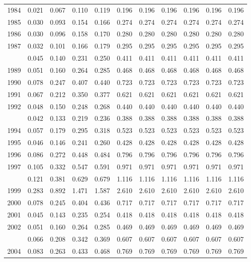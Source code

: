\documentclass[
]{article}
\begin{document}
\begin{longtable}[t]{lrrrrrrrrrr}
1984 & 0.021 & 0.067 & 0.110 & 0.119 & 0.196 & 0.196 & 0.196 & 0.196 & 0.196 & 0.196\\
1985 & 0.030 & 0.093 & 0.154 & 0.166 & 0.274 & 0.274 & 0.274 & 0.274 & 0.274 & 0.274\\
1986 & 0.030 & 0.096 & 0.158 & 0.170 & 0.280 & 0.280 & 0.280 & 0.280 & 0.280 & 0.280\\
1987 & 0.032 & 0.101 & 0.166 & 0.179 & 0.295 & 0.295 & 0.295 & 0.295 & 0.295 & 0.295\\
\addlinespace
1988 & 0.045 & 0.140 & 0.231 & 0.250 & 0.411 & 0.411 & 0.411 & 0.411 & 0.411 & 0.411\\
1989 & 0.051 & 0.160 & 0.264 & 0.285 & 0.468 & 0.468 & 0.468 & 0.468 & 0.468 & 0.468\\
1990 & 0.078 & 0.247 & 0.407 & 0.440 & 0.723 & 0.723 & 0.723 & 0.723 & 0.723 & 0.723\\
1991 & 0.067 & 0.212 & 0.350 & 0.377 & 0.621 & 0.621 & 0.621 & 0.621 & 0.621 & 0.621\\
1992 & 0.048 & 0.150 & 0.248 & 0.268 & 0.440 & 0.440 & 0.440 & 0.440 & 0.440 & 0.440\\
\addlinespace
1993 & 0.042 & 0.133 & 0.219 & 0.236 & 0.388 & 0.388 & 0.388 & 0.388 & 0.388 & 0.388\\
1994 & 0.057 & 0.179 & 0.295 & 0.318 & 0.523 & 0.523 & 0.523 & 0.523 & 0.523 & 0.523\\
1995 & 0.046 & 0.146 & 0.241 & 0.260 & 0.428 & 0.428 & 0.428 & 0.428 & 0.428 & 0.428\\
1996 & 0.086 & 0.272 & 0.448 & 0.484 & 0.796 & 0.796 & 0.796 & 0.796 & 0.796 & 0.796\\
1997 & 0.105 & 0.332 & 0.547 & 0.591 & 0.971 & 0.971 & 0.971 & 0.971 & 0.971 & 0.971\\
\addlinespace
1998 & 0.121 & 0.381 & 0.629 & 0.679 & 1.116 & 1.116 & 1.116 & 1.116 & 1.116 & 1.116\\
1999 & 0.283 & 0.892 & 1.471 & 1.587 & 2.610 & 2.610 & 2.610 & 2.610 & 2.610 & 2.610\\
2000 & 0.078 & 0.245 & 0.404 & 0.436 & 0.717 & 0.717 & 0.717 & 0.717 & 0.717 & 0.717\\
2001 & 0.045 & 0.143 & 0.235 & 0.254 & 0.418 & 0.418 & 0.418 & 0.418 & 0.418 & 0.418\\
2002 & 0.051 & 0.160 & 0.264 & 0.285 & 0.469 & 0.469 & 0.469 & 0.469 & 0.469 & 0.469\\
\addlinespace
2003 & 0.066 & 0.208 & 0.342 & 0.369 & 0.607 & 0.607 & 0.607 & 0.607 & 0.607 & 0.607\\
2004 & 0.083 & 0.263 & 0.433 & 0.468 & 0.769 & 0.769 & 0.769 & 0.769 & 0.769 & 0.769\\

\end{longtable}
\end{document}
